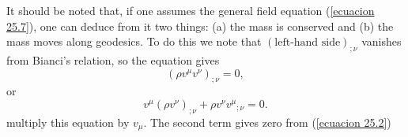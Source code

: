 It should be noted that, if one assumes the general field equation (\ref{ecuacion 25.7}), one can deduce from it two 
things: (a) the mass is conserved and  (b) the mass moves along geodesics. To do this we note that $(\mbox{left-hand 
side})_{;\nu}$ vanishes from Bianci's relation, so the equation gives
\[
\left( \rho v^\mu v^\nu \right)_{;\nu} = 0,
\]
or
\begin{equation}
 \label{ecuacion 25.9}
 v^\mu \left( \rho v^\nu \right)_{;\nu} + \rho v^\nu {v^\mu}_{;\nu} = 0.
\end{equation}
multiply this equation by $v_{\mu}$. The second term gives zero from (\ref{ecuacion 25.2})





